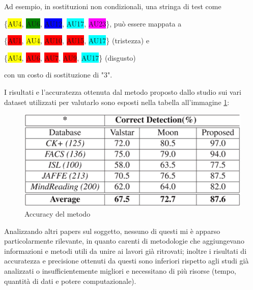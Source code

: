 Ad esempio, in sostituzioni non condizionali, una stringa di test come 

\{{\colorbox{yellow}{AU4}, \colorbox{green}{AU6}, \colorbox{blue}{AU12}, \colorbox{cyan}{AU17}, \colorbox{magenta}{AU23}\}}, può essere mappata a 

\{{\colorbox{red}{AU1}, \colorbox{yellow}{AU4}, \colorbox{red}{AU10}, \colorbox{red}{AU15}, \colorbox{cyan}{AU17}\}} (tristezza) e 

\{{\colorbox{yellow}{AU4}, \colorbox{red}{AU6}, \colorbox{red}{AU7}, \colorbox{red}{AU9}, \colorbox{cyan}{AU17}\}} (disgusto) 

con un costo di sostituzione di "3". 

I risultati e l’accuratezza ottenuta dal metodo proposto dallo studio sui vari dataset utilizzati per valutarlo sono esposti nella tabella all'immagine \ref{fig:image7}:

\begin{figure}
    \begin{center}    
        \includegraphics[width=1\linewidth]{images/22.png}
        \caption{Accuracy del metodo}
        \label{fig:image7}
    \end{center}
\end{figure}

\newpage

Analizzando altri papers sul soggetto, nessuno di questi mi è apparso particolarmente rilevante, in quanto carenti di metodologie che aggiungevano informazioni e metodi utili da unire ai lavori già ritrovati; inoltre i risultati di accuratezza e precisione ottenuti da questi sono inferiori rispetto agli studi già analizzati o insufficientemente migliori e necessitano di più risorse (tempo, quantità di dati e potere computazionale).


